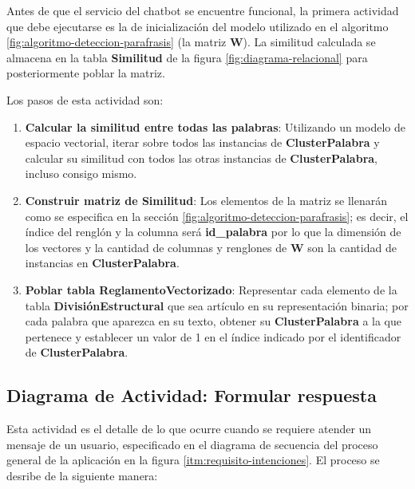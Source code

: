 Antes de que el servicio del chatbot se encuentre funcional, la primera actividad que debe ejecutarse es la de inicialización del modelo utilizado en el algoritmo \ref{fig:algoritmo-deteccion-parafrasis} (la matriz $\mathbf{W}$). La similitud calculada se almacena en la tabla \textbf{Similitud} de la figura \ref{fig:diagrama-relacional} para posteriormente poblar la matriz.

Los pasos de esta actividad son:

\begin{enumerate}
    \item \textbf{Calcular la similitud entre todas las palabras}: Utilizando un modelo de espacio vectorial, iterar sobre todos las instancias de \textbf{ClusterPalabra} y calcular su similitud con todos las otras instancias de \textbf{ClusterPalabra}, incluso consigo mismo.
    \item \textbf{Construir matriz de Similitud}: Los elementos de la matriz se llenarán como se especifica en la sección \ref{fig:algoritmo-deteccion-parafrasis}; es decir, el índice del renglón y la columna será \textbf{id\_palabra} por lo que la dimensión de los vectores y la cantidad de columnas y renglones de $\mathbf{W}$ son la cantidad de instancias en \textbf{ClusterPalabra}.
    \item \textbf{Poblar tabla ReglamentoVectorizado}: Representar cada elemento de la tabla \textbf{DivisiónEstructural} que sea artículo en su representación binaria; por cada palabra que aparezca en su texto, obtener su \textbf{ClusterPalabra} a la que pertenece y establecer un valor de 1 en el índice indicado por el identificador de \textbf{ClusterPalabra}.
\end{enumerate}



\subsection{Diagrama de Actividad: Formular respuesta}

Esta actividad es el detalle de lo que ocurre cuando se requiere atender un mensaje de un usuario, especificado en el diagrama de secuencia del proceso general de la aplicación en la figura \ref{itm:requisito-intenciones}. El proceso se desribe de la siguiente manera:

